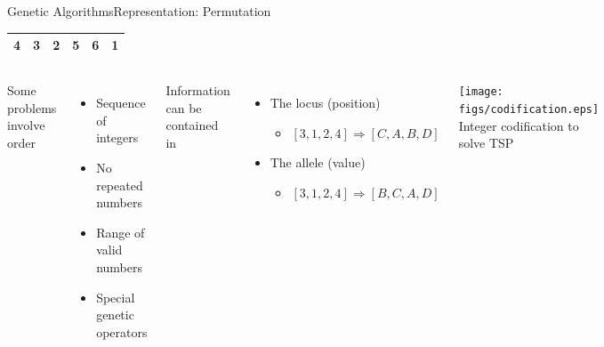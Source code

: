 \documentclass[10pt,compress]{beamer} %
\begin{document}
\begin{frame}{Genetic Algorithms}{Representation: Permutation}
	\vspace{-0.7cm}
	\begin{table}[]
	\centering
	\begin{tabular}{|l|l|l|l|l|l|}
	\hline
 	4 & 3 & 2 & 5 & 6 & 1 \\ \hline
	\end{tabular}
	\end{table}

	\vspace{-0.2cm}

    \begin{columns}
	Some problems involve order
	\begin{itemize}
		\item Sequence of integers
		\item No repeated numbers
		\item Range of valid numbers
		\item Special genetic operators
  	\end{itemize}
	Information can be contained in
	\begin{itemize}
		\item The locus (position)
		\begin{itemize}
		\item[] $[3,1,2,4] \Rightarrow [C,A,B,D]$
		\end{itemize}
		\item The allele (value)
		\begin{itemize}
		\item[] $[3,1,2,4] \Rightarrow [B,C,A,D]$
		\end{itemize}
	\end{itemize}
	\begin{center}
	\texttt{[image: figs/codification.eps]}\\
	\small{Integer codification to solve TSP}
	\end{center}
	\end{columns}
\end{frame}
\end{document}

